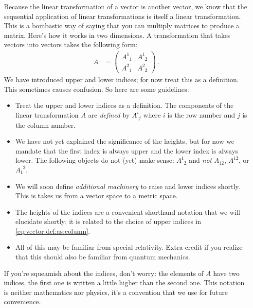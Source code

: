 Because the linear transformation of a vector is another vector, we know that the sequential application of linear transformations is itself a linear transformation. This is a bombastic way of saying that you can multiply matrices to produce a matrix.  Here’s how it works in two dimensions. A transformation that takes vectors into vectors takes the following form:
\begin{align}
  A &= 
  \begin{pmatrix}
   A^{1}_{\phantom{1}1} & A^{1}_{\phantom{1}2}
   \\
   A^{2}_{\phantom{1}1} & A^{2}_{\phantom{1}2}
  \end{pmatrix} \ .
\end{align}
We have introduced upper and lower indices; for now treat this as a definition. This sometimes causes confusion. So here are some guidelines:
\begin{itemize}
	\item Treat the upper and lower indices as a definition. The components of the linear transformation $A$ are \emph{defined} by $A^i_{\phantom{i}j}$ where $i$ is the row number and $j$ is the column number. 
	\item We have not yet explained the significance of the heights, but for now we mandate that the first index is always upper and the lower index is always lower. The following objects do not (yet) make sense: $A^{1}_{\phantom{1}2}$ and \emph{not} $A_{12}$, $A^{12}$, or $A_{1}^{\phantom{1}2}$.
	\item We will soon define \emph{additional machinery} to raise and lower indices shortly. This is takes us from a vector space to a metric space.
	\item The heights of the indices are a convenient shorthand notation that we will elucidate shortly; it is related to the choice of upper indices in \eqref{eq:vector:def:as:column}.
	\item All of this may be familiar from special relativity. Extra credit if you realize that this should also be familiar from quantum mechanics.
\end{itemize}
If you’re squeamish about the indices, don’t worry: the elements of $A$ have two indices, the first one is written a little higher than the second one. This notation is neither mathematics nor physics, it’s a convention that we use for future convenience.


